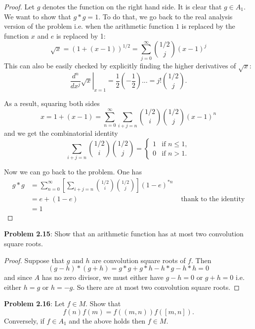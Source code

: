 \documentclass{article}
\begin{document}
\begin{proof}
Let $g$ denotes the function on the right hand side. It is clear that $g \in A_1$. We want to show that $g * g = 1$. To do that, we go back to the real analysis version of the problem i.e. when the arithmetic function $1$ is replaced by the function $x$ and $e$ is replaced by 1:
$$\sqrt{x} = (1 + (x - 1))^{1/2} = \sum_{j = 0}^{\infty} \binom{1/2}{j} (x - 1)^j$$
This can also be easily checked by explicitly finding the higher derivatives of $\sqrt{x}$:
$$\left. \frac{d^n}{dx^j} \sqrt{x} \right|_{x = 1} = \frac{1}{2} \left(-\frac{1}{2}\right) ... = j! \binom{1/2}{j}.$$

As a result, squaring both sides
$$x = 1 + (x - 1) = \sum_{n = 0}^{\infty} \sum_{i + j = n} \binom{1/2}{i} \binom{1/2}{j} (x - 1)^n$$
and we get the combinatorial identity
$$\sum_{i + j = n} \binom{1/2}{i} \binom{1/2}{j} = \begin{cases}1 &\text{if } n \leq 1, \\ 0 &\text{if } n > 1.\end{cases}$$

Now we can go back to the problem. One has
\begin{align*}
g * g &= \sum_{n = 0}^{\infty} \left[\sum_{i + j = n} \binom{1/2}{i} \binom{1/2}{j} \right] (1 - e)^{*n}\\
&= e + (1 - e) &\text{ thank to the identity}\\
&= 1
\end{align*}
\end{proof}

\textbf{Problem 2.15}: Show that an arithmetic function has at most two convolution square roots.

\begin{proof}
Suppose that $g$ and $h$ are convolution square roots of $f$. Then
$$(g - h) * (g + h) = g * g + g * h - h * g - h * h = 0$$
and since $A$ has no zero divisor, we must either have $g - h = 0$ or $g + h = 0$ i.e. either $h = g$ or $h = -g$. So there are at most two convolution square roots.
\end{proof}

\textbf{Problem 2.16}: Let $f \in M$. Show that
$$f(n) f(m) = f((m, n)) f([m, n]).$$
Conversely, if $f \in A_1$ and the above holds then $f \in M$.
\end{document}
